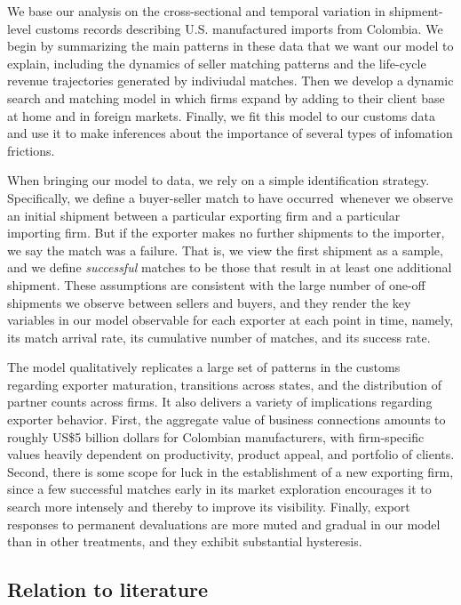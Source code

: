 \documentclass[12pt]{article}
\begin{document}
We base our analysis on the cross-sectional and temporal variation in
shipment-level customs records describing U.S. manufactured imports from
Colombia. We begin by summarizing the main patterns in these data that we
want our model to explain, including the dynamics of seller matching
patterns and the life-cycle revenue trajectories generated by indiviudal
matches. Then we develop a dynamic search and matching model in which firms
expand by adding to their client base at home and in foreign markets.
Finally, we fit this model to our customs data and use it to make inferences
about the importance of several types of infomation frictions.

When bringing our model to data, we rely on a simple identification
strategy. Specifically, we define a buyer-seller match to have occurred\
whenever we observe an initial shipment between a particular exporting firm
and a particular importing firm. But if the exporter makes no further
shipments to the importer, we say the match was a failure. That is, we view
the first shipment as a sample, and we define \textit{successful} matches to
be those that result in at least one additional shipment. These assumptions
are consistent with the large number of one-off shipments we observe between
sellers and buyers, and they render the key variables in our model
observable for each exporter at each point in time, namely, its match
arrival rate, its cumulative number of matches, and its success rate.

The model qualitatively replicates a large set of patterns in the customs
regarding exporter maturation, transitions across states, and the
distribution of partner counts across firms. It also delivers a variety of
implications regarding exporter behavior. First, the aggregate value of
business connections amounts to roughly US\$5 billion dollars for Colombian
manufacturers, with firm-specific values heavily dependent on productivity,
product appeal, and portfolio of clients. Second, there is some scope for
luck in the establishment of a new exporting firm, since a few successful
matches early in its market exploration encourages it to search more
intensely and thereby to improve its visibility. Finally, export responses
to permanent devaluations are more muted and gradual in our model than in
other treatments, and they exhibit substantial hysteresis.

\subsection{Relation to literature}
\end{document}
